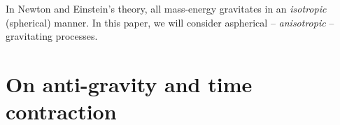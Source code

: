 \documentclass[12pt]{article}
\begin{document}

In Newton and Einstein's theory, all mass-energy gravitates in an {\textit{isotropic}} (spherical) manner.
In this paper, we will consider aspherical -- {\textit{anisotropic}} -- gravitating processes.






\section{On anti-gravity and time contraction}
\end{document}

